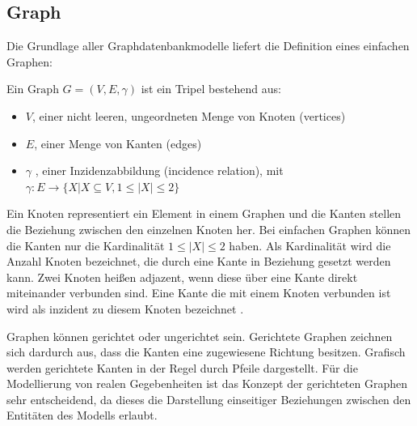 \subsection{Graph}
Die Grundlage aller Graphdatenbankmodelle liefert die Definition eines einfachen Graphen:
\begin{definition}
	Ein $\text{Graph } G=(V,E,\gamma)$ ist ein Tripel bestehend aus:
	\begin{itemize}
		\item $V$, einer nicht leeren, ungeordneten Menge von Knoten (vertices)
		\item $E$, einer Menge von Kanten (edges)
		\item $\gamma$ , einer Inzidenzabbildung (incidence relation), mit\\
		$\gamma : E \longrightarrow \{X | X \subseteq V, 1 \leq |X| \leq 2\}$
	\end{itemize}\cite[Seite 21]{pbeck01}
\end{definition}
Ein Knoten representiert ein Element in einem Graphen und die Kanten stellen die Beziehung zwischen den einzelnen Knoten her.
Bei einfachen Graphen können die Kanten nur die Kardinalität $1 \leq |X| \leq 2$ haben.
Als Kardinalität wird die Anzahl Knoten bezeichnet, die durch eine Kante in Beziehung gesetzt werden kann.
Zwei Knoten heißen adjazent, wenn diese über eine Kante direkt miteinander verbunden sind.
Eine Kante die mit einem Knoten verbunden ist wird als inzident zu diesem Knoten bezeichnet \cite{knauer2015diskrete}.

Graphen können gerichtet oder ungerichtet sein.
Gerichtete Graphen zeichnen sich dardurch aus, dass die Kanten eine zugewiesene Richtung besitzen.
Grafisch werden gerichtete Kanten in der Regel durch Pfeile dargestellt.
Für die Modellierung von realen Gegebenheiten ist das Konzept der gerichteten Graphen sehr entscheidend, da dieses die Darstellung einseitiger Beziehungen zwischen den Entitäten des Modells erlaubt.

